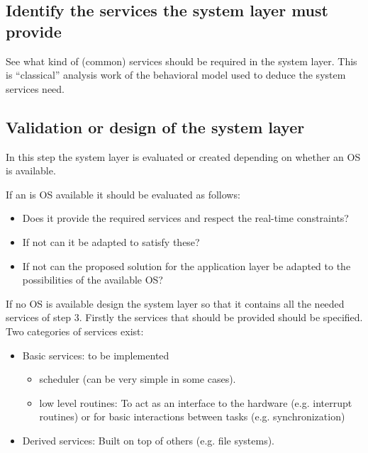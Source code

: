\documentclass[../main.tex]{subfiles}
\begin{document}
\subsection{Identify the services the system layer must provide}
\label{sss:services}
See what kind of (common) services should be required in the  system layer. 
This is ``classical'' analysis work of the behavioral model used to deduce the system services need.




\subsection{Validation or design of the system layer}
\label{sss:valid}
In  this step the  system layer is evaluated or created depending on whether an OS is available.

If an is OS available it should be evaluated as follows:
\begin{itemize}
	\item Does it provide the required services and respect the real-time constraints? 
	\item If not can it be adapted to satisfy these?
	\item If not can the proposed solution for the application layer be adapted to the possibilities of the available OS?
\end{itemize}

If no OS is available design the  system layer so that it contains all the needed services of step 3.
Firstly the services that should be provided should be specified. 
Two categories of services exist: 
\begin{itemize}
	\item Basic services: to be implemented
	\begin{itemize}
		\item scheduler (can be very simple in some cases).
		\item low level routines: To act as an interface to the hardware (e.g. interrupt routines) or for basic interactions between tasks (e.g. synchronization)
	\end{itemize}
	
	\item Derived services: Built on top of others (e.g. file systems).
\end{itemize}
\end{document}
